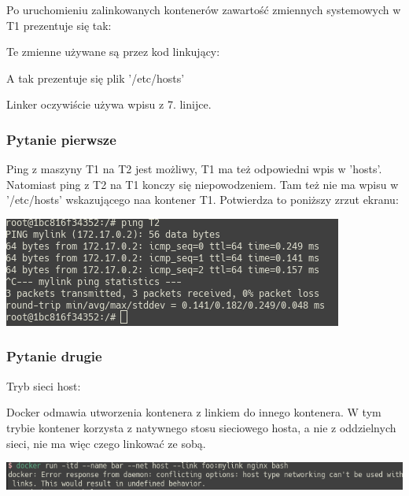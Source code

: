 \documentclass[12pt]{article}
\begin{document}
    Po uruchomieniu zalinkowanych kontenerów zawartość zmiennych systemowych w T1 prezentuje się tak:

    

    Te zmienne używane są przez kod linkujący:

    

    A tak prezentuje się plik '/etc/hosts'

    

    Linker oczywiście używa wpisu z 7. linijce.

    \subsubsection{Pytanie pierwsze}

    Ping z maszyny T1 na T2 jest możliwy, T1 ma też odpowiedni wpis w 'hosts'. Natomiast ping z T2 na T1 konczy się niepowodzeniem. Tam też nie ma wpisu w '/etc/hosts' wskazującego naa kontener T1. Potwierdza to poniższy zrzut ekranu:

    \includegraphics[width=\textwidth]{pingt1t2.png}

    \subsubsection{Pytanie drugie}

    {\Large Tryb sieci host:}

    Docker odmawia utworzenia kontenera z linkiem do innego kontenera. W tym trybie kontener korzysta z natywnego stosu sieciowego hosta, a nie z oddzielnych sieci, nie ma więc czego linkować ze sobą.

    \includegraphics[width=\textwidth]{hostlink.png}

    \vspace{0.5cm}
\end{document}
